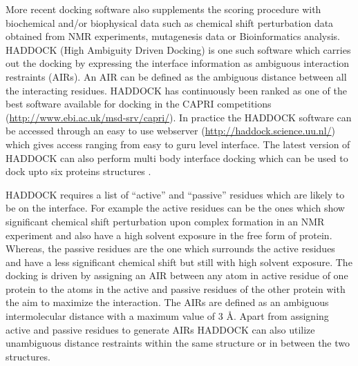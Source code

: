 		More recent docking software also supplements the scoring procedure with biochemical and/or biophysical data such as chemical shift perturbation data obtained from NMR experiments, mutagenesis data or Bioinformatics analysis. HADDOCK (High Ambiguity Driven Docking) \parencite{Dominguez2003} is one such software which carries out the docking by expressing the interface information as ambiguous interaction restraints (AIRs). An AIR can be defined as the ambiguous distance between all the interacting residues. HADDOCK has continuously been ranked as one of the best software available for docking in the CAPRI competitions (\url{http://www.ebi.ac.uk/msd-srv/capri/}). In practice the HADDOCK software can be accessed through an easy to use webserver \parencite{DeVries2010} (\url{http://haddock.science.uu.nl/}) which gives access ranging from easy to guru level interface. The latest version of HADDOCK can also perform multi body interface docking which can be used to dock upto six proteins structures \parencite{Karaca2010}.
		 
		HADDOCK requires a list of \textquotedblleft active\textquotedblright{ } and \textquotedblleft passive\textquotedblright{ }  residues which are likely to be on the interface. For example the active residues can be the ones which show significant chemical shift perturbation upon complex formation in an NMR experiment and also have a high solvent exposure in the free form of protein. Whereas, the passive residues are the one which surrounds the active residues and have a less significant chemical shift but still with high solvent exposure. The docking is driven by assigning an AIR between any atom in active residue of one protein to the atoms in the active and passive residues of the other protein with the aim to maximize the interaction. The AIRs are defined as an ambiguous intermolecular distance with a maximum value of 3 \AA. Apart from assigning active and passive residues to generate AIRs HADDOCK can also utilize unambiguous distance restraints within the same structure or in between the two structures.
		
